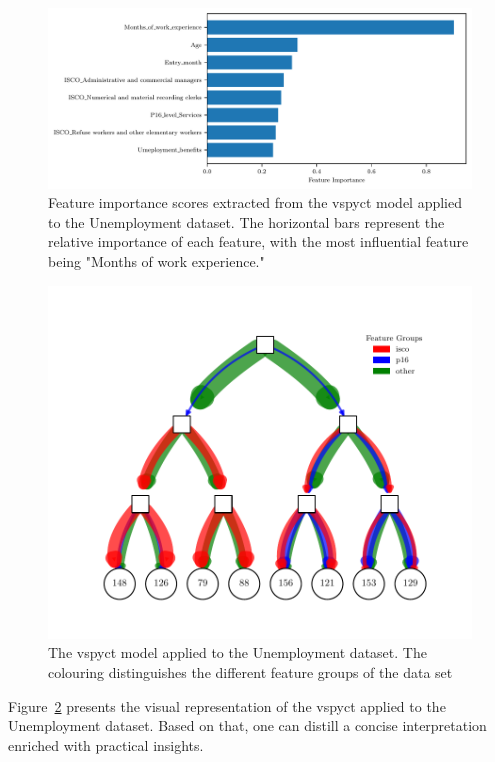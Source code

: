 \documentclass[3p,review,authoryear]{elsarticle}
\begin{document}
\begin{figure}[h!]
    \centering
    \includegraphics[width=1.0\textwidth]{feature_importance.pdf}
    \caption{Feature importance scores extracted from the \gls{vspyct} model applied to the Unemployment dataset. The horizontal bars represent the relative importance of each feature, with the most influential feature being "Months of work experience."}
    \label{fig:feature_importance}
\end{figure}

\begin{figure}[h!]
    \centering
    \includegraphics{hecat_tree_old_temp.pdf}
    \caption{The \gls{vspyct} model applied to the Unemployment dataset. The colouring distinguishes the different feature groups of the data set}
    \label{fig:inter_tree}
\end{figure}

Figure~\ref{fig:inter_tree} presents the visual representation of the \gls{vspyct} applied to the Unemployment dataset.
Based on that, one can distill a concise interpretation enriched with practical insights.
\end{document}
